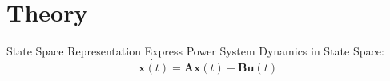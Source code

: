 \section[Theory]{Theory}
\label{sec:lasso_theory}

\begin{frame}[fragile]{State Space Representation}
	Express Power System Dynamics in State Space:
	\begin{equation}
		\label{eq:ssr}
		\dot{\textbf{x}(t)} = \textbf{A}\textbf{x}(t)
		+ \textbf{B}\textbf{u}(t)
	\end{equation}
\end{frame}